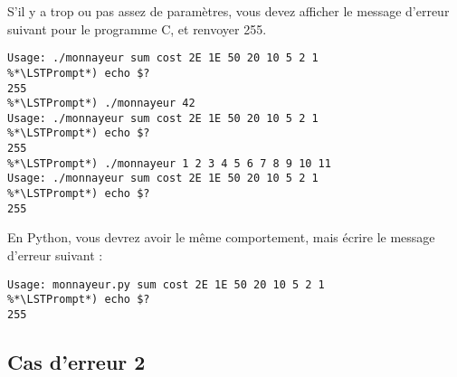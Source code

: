 \bigskip

\noindent S'il y a trop ou pas assez de paramètres, vous devez afficher le message d'erreur suivant pour le programme C, et renvoyer 255.

\bigskip

\noindent {}

\bigskip

\begin{lstlisting}[frame=single,title={Cas d'erreur 1 (C)}]
%*\LSTPrompt*) ./monnayeur
Usage: ./monnayeur sum cost 2E 1E 50 20 10 5 2 1
%*\LSTPrompt*) echo $?
255
%*\LSTPrompt*) ./monnayeur 42
Usage: ./monnayeur sum cost 2E 1E 50 20 10 5 2 1
%*\LSTPrompt*) echo $?
255
%*\LSTPrompt*) ./monnayeur 1 2 3 4 5 6 7 8 9 10 11
Usage: ./monnayeur sum cost 2E 1E 50 20 10 5 2 1
%*\LSTPrompt*) echo $?
255
\end{lstlisting}

\bigskip

\noindent En Python, vous devrez avoir le même comportement, mais écrire le message d'erreur suivant :

\bigskip

\noindent {}

\bigskip

\begin{lstlisting}[frame=single,title={Cas d'erreur 1 (Python)}]
%*\LSTPrompt*) python3.8 monnayeur.py
Usage: monnayeur.py sum cost 2E 1E 50 20 10 5 2 1
%*\LSTPrompt*) echo $?
255
\end{lstlisting}




\newpage

\subsection{Cas d'erreur 2}

